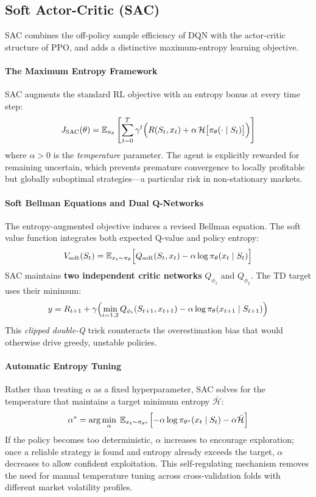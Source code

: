\subsection{Soft Actor-Critic (SAC)}
\label{sec:sac-theory}

SAC \cite{haarnoja2018soft} combines the off-policy sample efficiency of DQN with the actor-critic structure of PPO, and adds a distinctive maximum-entropy learning objective.

\paragraph{The Maximum Entropy Framework}
SAC augments the standard RL objective with an entropy bonus at every time step:
\[
    J_{\text{SAC}}(\theta) = \mathbb{E}_{\pi_\theta} \left[ \sum_{t=0}^{T} \gamma^t \Bigl( R(S_t, x_t) + \alpha \,\mathcal{H}\bigl[\pi_\theta(\cdot \mid S_t)\bigr] \Bigr) \right]
\]
where $\alpha > 0$ is the \textit{temperature} parameter. The agent is explicitly rewarded for remaining uncertain, which prevents premature convergence to locally profitable but globally suboptimal strategies—a particular risk in non-stationary markets.

\paragraph{Soft Bellman Equations and Dual Q-Networks}
The entropy-augmented objective induces a revised Bellman equation. The soft value function integrates both expected Q-value and policy entropy:
\[
    V_{\text{soft}}(S_t) = \mathbb{E}_{x_t \sim \pi_\theta} \Bigl[ Q_{\text{soft}}(S_t, x_t) - \alpha \log \pi_\theta(x_t \mid S_t) \Bigr]
\]
SAC maintains \textbf{two independent critic networks} $Q_{\phi_1}$ and $Q_{\phi_2}$. The TD target uses their minimum:
\[
    y = R_{t+1} + \gamma \Bigl( \min_{i=1,2} Q_{\phi_i}(S_{t+1}, x_{t+1}) - \alpha \log \pi_\theta(x_{t+1} \mid S_{t+1}) \Bigr)
\]
This \textit{clipped double-Q} trick counteracts the overestimation bias that would otherwise drive greedy, unstable policies.

\paragraph{Automatic Entropy Tuning}
Rather than treating $\alpha$ as a fixed hyperparameter, SAC solves for the temperature that maintains a target minimum entropy $\bar{\mathcal{H}}$:
\[
    \alpha^* = \arg\min_\alpha\; \mathbb{E}_{x_t \sim \pi_{\theta^*}} \Bigl[ -\alpha \log \pi_{\theta^*}(x_t \mid S_t) - \alpha \bar{\mathcal{H}} \Bigr]
\]
If the policy becomes too deterministic, $\alpha$ increases to encourage exploration; once a reliable strategy is found and entropy already exceeds the target, $\alpha$ decreases to allow confident exploitation. This self-regulating mechanism removes the need for manual temperature tuning across cross-validation folds with different market volatility profiles.

